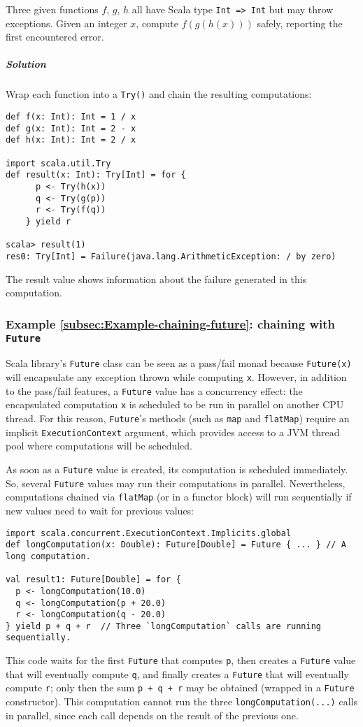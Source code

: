 Three given functions $f$, $g$, $h$ all have Scala type \lstinline!Int => Int!
but may throw exceptions. Given an integer $x$, compute $f(g(h(x)))$
safely, reporting the first encountered error.

\subparagraph{Solution}

Wrap each function into a \lstinline!Try()! and chain the resulting
computations:
\begin{lstlisting}
def f(x: Int): Int = 1 / x
def g(x: Int): Int = 2 - x
def h(x: Int): Int = 2 / x

import scala.util.Try
def result(x: Int): Try[Int] = for {
      p <- Try(h(x))
      q <- Try(g(p))
      r <- Try(f(q))
    } yield r

scala> result(1)
res0: Try[Int] = Failure(java.lang.ArithmeticException: / by zero)
\end{lstlisting}
The result value shows information about the failure generated in
this computation.

\subsubsection{Example \label{subsec:Example-chaining-future}\ref{subsec:Example-chaining-future}:
chaining with \texttt{Future}}

Scala library\textsf{'}s \lstinline!Future! class can be seen as a pass/fail
monad because \lstinline!Future(x)! will encapsulate any exception
thrown while computing \lstinline!x!. However, in addition to the
pass/fail features, a \lstinline!Future! value has a concurrency
effect: the encapsulated computation \lstinline!x! is scheduled to
be run in parallel on another CPU thread. For this reason, \lstinline!Future!\textsf{'}s
methods (such as \lstinline!map! and \lstinline!flatMap!) require
an implicit \lstinline!ExecutionContext! argument, which provides
access to a JVM thread pool where computations will be scheduled.

As soon as a \lstinline!Future! value is created, its computation
is scheduled immediately. So, several \lstinline!Future! values may
run their computations in parallel. Nevertheless, computations chained
via \lstinline!flatMap! (or in a functor block) will run sequentially
if new values need to wait for previous values:
\begin{lstlisting}
import scala.concurrent.ExecutionContext.Implicits.global
def longComputation(x: Double): Future[Double] = Future { ... } // A long computation.

val result1: Future[Double] = for {
  p <- longComputation(10.0)
  q <- longComputation(p + 20.0)
  r <- longComputation(q - 20.0)
} yield p + q + r  // Three `longComputation` calls are running sequentially.
\end{lstlisting}
This code waits for the first \lstinline!Future! that computes \lstinline!p!,
then creates a \lstinline!Future! value that will eventually compute
\lstinline!q!, and finally creates a \lstinline!Future! that will
eventually compute \lstinline!r!; only then the sum \lstinline!p + q + r!
may be obtained (wrapped in a \lstinline!Future! constructor). This
computation cannot run the three \lstinline!longComputation(...)!
calls in parallel, since each call depends on the result of the previous
one.

